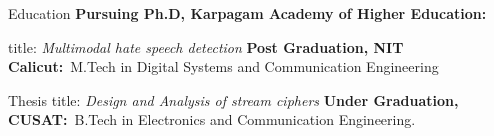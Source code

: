\begin{rubric}{Education}
\entry*[2023-- ------]%
	\textbf{\textbf{Pursuing Ph.D}, Karpagam Academy of Higher Education:}
	\par title: \emph{Multimodal hate speech detection}
%
\entry*[2007 -- 2009]%
	\textbf{\textbf{Post Graduation}, NIT Calicut:}~M.Tech in Digital Systems and Communication Engineering
	\par Thesis title: \emph{Design and Analysis of stream ciphers}
%
\entry*[2000 -- 2004]%
	\textbf{Under Graduation, CUSAT:}~B.Tech in Electronics and Communication Engineering.\par
	
\end{rubric}